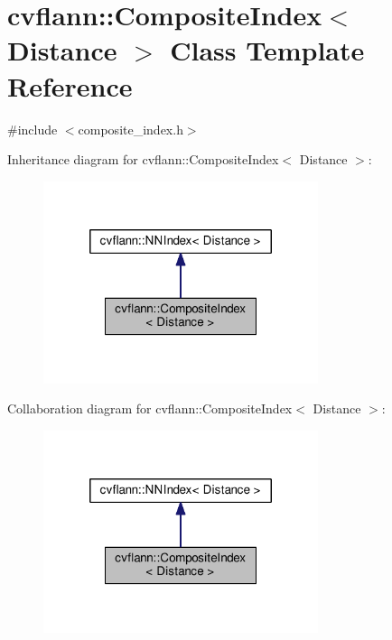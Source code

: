 \hypertarget{classcvflann_1_1CompositeIndex}{\section{cvflann\-:\-:Composite\-Index$<$ Distance $>$ Class Template Reference}
\label{classcvflann_1_1CompositeIndex}
}


{\ttfamily \#include $<$composite\-\_\-index.\-h$>$}



Inheritance diagram for cvflann\-:\-:Composite\-Index$<$ Distance $>$\-:\nopagebreak
\begin{figure}[H]
\begin{center}
\leavevmode
\includegraphics[width=228pt]{classcvflann_1_1CompositeIndex__inherit__graph}
\end{center}
\end{figure}


Collaboration diagram for cvflann\-:\-:Composite\-Index$<$ Distance $>$\-:\nopagebreak
\begin{figure}[H]
\begin{center}
\leavevmode
\includegraphics[width=228pt]{classcvflann_1_1CompositeIndex__coll__graph}
\end{center}
\end{figure}
